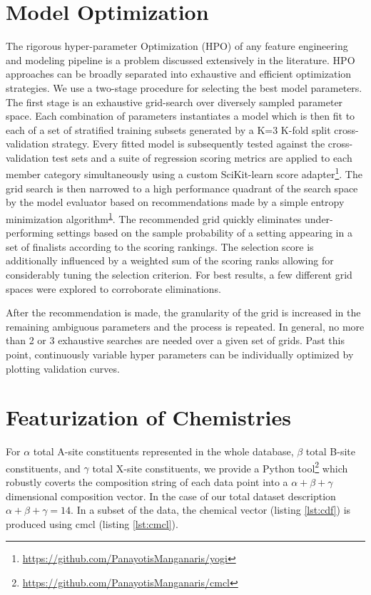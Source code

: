 \section{Model Optimization}
\label{sec:org1773aa2}
The rigorous hyper-parameter Optimization (HPO) of any feature engineering and modeling pipeline is a problem discussed extensively in the literature.
HPO approaches can be broadly separated into exhaustive and efficient optimization strategies.
\autocite{yang-2020-hyper-optim}
We use a two-stage procedure for selecting the best model parameters.
The first stage is an exhaustive grid-search over diversely sampled parameter space.
Each combination of parameters instantiates a model which is then fit to each of a set of stratified training subsets generated by a K=3 K-fold split cross-validation strategy.
Every fitted model is subsequently tested against the cross-validation test sets and a suite of regression scoring metrics are applied to each member category simultaneously using a custom SciKit-learn score adapter\footnote{\url{https://github.com/PanayotisManganaris/yogi}\label{org92962e9}}.
The grid search is then narrowed to a high performance quadrant of the search space by the model evaluator based on recommendations made by a simple entropy minimization algorithm\textsuperscript{\ref{org92962e9}}.
The recommended grid quickly eliminates under-performing settings based on the sample probability of a setting appearing in a set of finalists according to the scoring rankings.
The selection score is additionally influenced by a weighted sum of the scoring ranks allowing for considerably tuning the selection criterion.
For best results, a few different grid spaces were explored to corroborate eliminations.

After the recommendation is made, the granularity of the grid is increased in the remaining ambiguous parameters and the process is repeated.
In general, no more than 2 or 3 exhaustive searches are needed over a given set of grids.
Past this point, continuously variable hyper parameters can be individually optimized by plotting validation curves.

\section{Featurization of Chemistries}
\label{sec:org272f90c}
For \(\alpha\) total A-site constituents represented in the whole database, \(\beta\) total B-site constituents, and \(\gamma\) total X-site constituents, we provide a Python tool\footnote{\url{https://github.com/PanayotisManganaris/cmcl}\label{orgf8d27e0}} which robustly coverts the composition string of each data point into a \(\alpha + \beta + \gamma\) dimensional composition vector.
In the case of our total dataset description \(\alpha + \beta + \gamma = 14\).
\autocite{yang-2022-high-throug}
In a subset of the data, the chemical vector (listing \ref{lst:cdf}) is produced using cmcl (listing \ref{lst:cmcl}).

